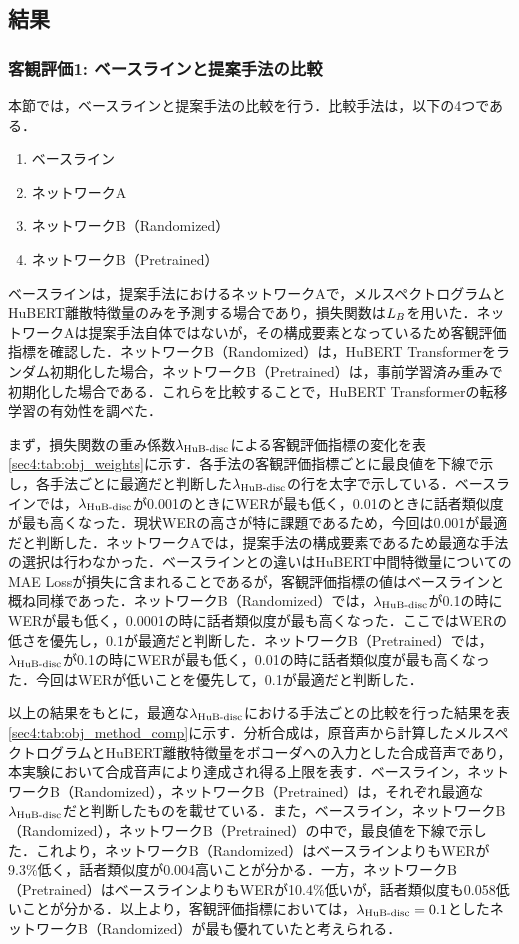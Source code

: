 \subsection{結果}
\subsubsection{客観評価1: ベースラインと提案手法の比較}
\label{sec4:sec:obj_1}
本節では，ベースラインと提案手法の比較を行う．比較手法は，以下の4つである．
\begin{enumerate}
    \item ベースライン
    \item ネットワークA
    \item ネットワークB（Randomized）
    \item ネットワークB（Pretrained）
\end{enumerate}
ベースラインは，提案手法におけるネットワークAで，メルスペクトログラムとHuBERT離散特徴量のみを予測する場合であり，損失関数は$L_{B}$を用いた．ネットワークAは提案手法自体ではないが，その構成要素となっているため客観評価指標を確認した．ネットワークB（Randomized）は，HuBERT Transformerをランダム初期化した場合，ネットワークB（Pretrained）は，事前学習済み重みで初期化した場合である．これらを比較することで，HuBERT Transformerの転移学習の有効性を調べた．

まず，損失関数の重み係数$\lambda_{\text{HuB-disc}}$による客観評価指標の変化を表\ref{sec4:tab:obj_weights}に示す．各手法の客観評価指標ごとに最良値を下線で示し，各手法ごとに最適だと判断した$\lambda_{\text{HuB-disc}}$の行を太字で示している．ベースラインでは，$\lambda_{\text{HuB-disc}}$が0.001のときにWERが最も低く，0.01のときに話者類似度が最も高くなった．現状WERの高さが特に課題であるため，今回は0.001が最適だと判断した．ネットワークAでは，提案手法の構成要素であるため最適な手法の選択は行わなかった．ベースラインとの違いはHuBERT中間特徴量についてのMAE Lossが損失に含まれることであるが，客観評価指標の値はベースラインと概ね同様であった．ネットワークB（Randomized）では，$\lambda_{\text{HuB-disc}}$が0.1の時にWERが最も低く，0.0001の時に話者類似度が最も高くなった．ここではWERの低さを優先し，0.1が最適だと判断した．ネットワークB（Pretrained）では，$\lambda_{\text{HuB-disc}}$が0.1の時にWERが最も低く，0.01の時に話者類似度が最も高くなった．今回はWERが低いことを優先して，0.1が最適だと判断した．

以上の結果をもとに，最適な$\lambda_{\text{HuB-disc}}$における手法ごとの比較を行った結果を表\ref{sec4:tab:obj_method_comp}に示す．分析合成は，原音声から計算したメルスペクトログラムとHuBERT離散特徴量をボコーダへの入力とした合成音声であり，本実験において合成音声により達成され得る上限を表す．ベースライン，ネットワークB（Randomized），ネットワークB（Pretrained）は，それぞれ最適な$\lambda_{\text{HuB-disc}}$だと判断したものを載せている．また，ベースライン，ネットワークB（Randomized），ネットワークB（Pretrained）の中で，最良値を下線で示した．これより，ネットワークB（Randomized）はベースラインよりもWERが9.3\%低く，話者類似度が0.004高いことが分かる．一方，ネットワークB（Pretrained）はベースラインよりもWERが10.4\%低いが，話者類似度も0.058低いことが分かる．以上より，客観評価指標においては，$\lambda_{\text{HuB-disc}} = 0.1$としたネットワークB（Randomized）が最も優れていたと考えられる．

